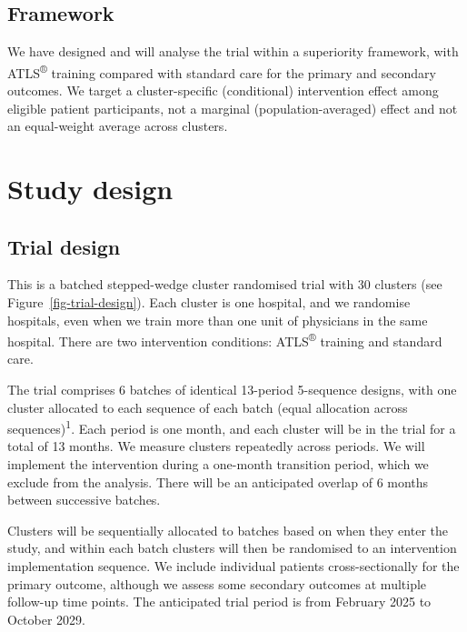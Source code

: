 \documentclass[
]{scrartcl}
\begin{document}
\subsection{Framework}\label{sec-framework}

We have designed and will analyse the trial within a superiority
framework, with ATLS\textsuperscript{®} training compared with standard
care for the primary and secondary outcomes. We target a
cluster-specific (conditional) intervention effect among eligible
patient participants, not a marginal (population-averaged) effect and
not an equal-weight average across clusters.

\section{Study design}\label{sec-study-design}

\subsection{Trial design}\label{sec-trial-design}

This is a batched stepped-wedge cluster randomised trial with 30
clusters (see Figure~\ref{fig-trial-design}). Each cluster is one
hospital, and we randomise hospitals, even when we train more than one
unit of physicians in the same hospital. There are two intervention
conditions: ATLS\textsuperscript{®} training and standard care.

The trial comprises 6 batches of identical 13-period 5-sequence designs,
with one cluster allocated to each sequence of each batch (equal
allocation across sequences)\textsuperscript{1}. Each period is one
month, and each cluster will be in the trial for a total of 13 months.
We measure clusters repeatedly across periods. We will implement the
intervention during a one-month transition period, which we exclude from
the analysis. There will be an anticipated overlap of 6 months between
successive batches.

Clusters will be sequentially allocated to batches based on when they
enter the study, and within each batch clusters will then be randomised
to an intervention implementation sequence. We include individual
patients cross-sectionally for the primary outcome, although we assess
some secondary outcomes at multiple follow-up time points. The
anticipated trial period is from February 2025 to October 2029.
\end{document}
